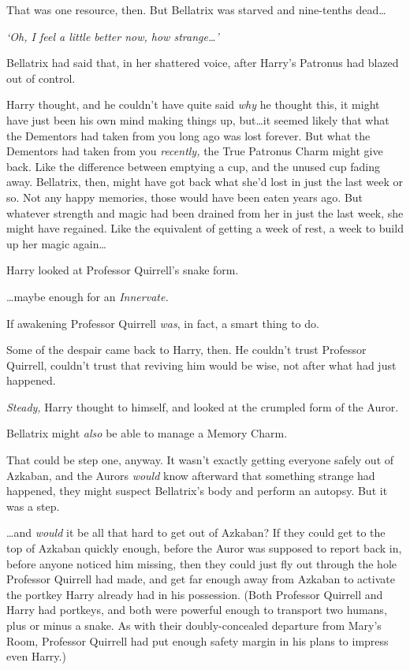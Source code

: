 That was one resource, then. But Bellatrix was starved and nine-tenths
dead…

\emph{`Oh, I feel a little better now, how strange…'}

Bellatrix had said that, in her shattered voice, after Harry's Patronus had
blazed out of control.

Harry thought, and he couldn't have quite said \emph{why} he thought this, it
might have just been his own mind making things up, but…it seemed
likely that what the Dementors had taken from you long ago was lost forever.
But what the Dementors had taken from you \emph{recently,} the True Patronus
Charm might give back. Like the difference between emptying a cup, and the
unused cup fading away. Bellatrix, then, might have got back what she'd lost in
just the last week or so. Not any happy memories, those would have been eaten
years ago. But whatever strength and magic had been drained from her in just
the last week, she might have regained. Like the equivalent of getting a week
of rest, a week to build up her magic again…

Harry looked at Professor Quirrell's snake form.

…maybe enough for an \emph{Innervate.}

If awakening Professor Quirrell \emph{was}, in fact, a smart thing to do.

Some of the despair came back to Harry, then. He couldn't trust Professor
Quirrell, couldn't trust that reviving him would be wise, not after what had
just happened.

\emph{Steady,} Harry thought to himself, and looked at the crumpled form of the
Auror.

Bellatrix might \emph{also} be able to manage a Memory Charm.

That could be step one, anyway. It wasn't exactly getting everyone safely out
of Azkaban, and the Aurors \emph{would} know afterward that something strange
had happened, they might suspect Bellatrix's body and perform an autopsy. But
it was a step.

…and \emph{would} it be all that hard to get out of Azkaban? If they
could get to the top of Azkaban quickly enough, before the Auror was supposed
to report back in, before anyone noticed him missing, then they could just fly
out through the hole Professor Quirrell had made, and get far enough away from
Azkaban to activate the portkey Harry already had in his possession. (Both
Professor Quirrell and Harry had portkeys, and both were powerful enough to
transport two humans, plus or minus a snake. As with their doubly-concealed
departure from Mary's Room, Professor Quirrell had put enough safety margin in
his plans to impress even Harry.)

